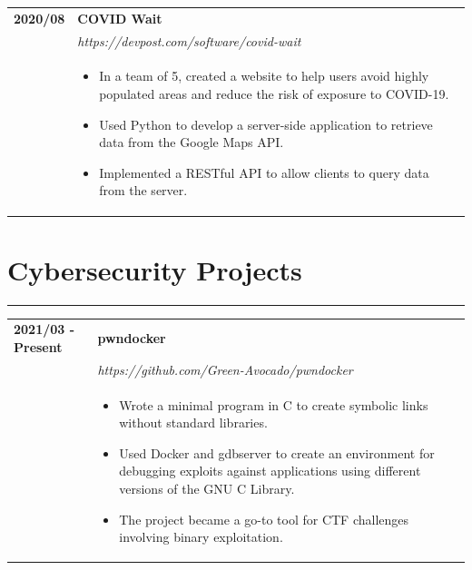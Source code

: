 \documentclass[letterpaper]{article}
\newcommand{\sect}[1]{\section*{#1}
                        {\color{cyan}
                        \rule{\textwidth}{1pt}
                        \vspace{-1ex}}}
\begin{document}
        \begin{tabular}{p{} p{}}
            \textbf{2020/08} & \textbf{COVID Wait} \\
            & \emph{https://devpost.com/software/covid-wait} \\
            & \begin{itemize}
                \item In a team of 5, created a website to help users avoid highly populated areas and
                    reduce the risk of exposure to COVID-19.
                \item Used Python to develop a server-side application to retrieve data from the Google
                    Maps API.
                \item Implemented a RESTful API to allow clients to query data from the server.
            \end{itemize}
            \\
        \end{tabular}

    \sect{Cybersecurity Projects}

        \begin{tabular}{p{} p{}}
            \textbf{2021/03 - Present} & \textbf{pwndocker} \\
            & \emph{https://github.com/Green-Avocado/pwndocker} \\
            & \begin{itemize}
                \item Wrote a minimal program in C to create symbolic links without standard libraries.
                \item Used Docker and gdbserver to create an environment for debugging exploits against
                    applications using different versions of the GNU C Library.
                \item The project became a go-to tool for CTF challenges involving binary exploitation.
            \end{itemize}
            \\
        \end{tabular}
\end{document}
